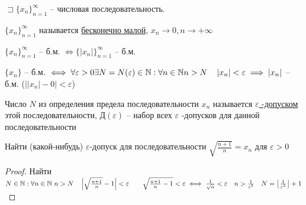     \begin{definition}
        $\sqsupset \{x_n\}_{n=1}^{\infty }$ -- числовая последовательность. 

        $\{x_n\}_{n=1}^{\infty }$ называется \underline{бесконечно малой}, $x_{n} \to 0, n\to +\infty $
    \end{definition}
    
    \begin{note}
        $\{x_n\}_{n=1}^{\infty }$ -- б.м. $\iff \{\left| x_{n}  \right| \}_{n=1}^{\infty }$ -- б.м.

        $\{x_n\}$ -- б.м. $\iff  \forall \varepsilon>0 \exists N = N(\varepsilon)\in \mathbb{N}: \forall n\in \mathbb{N}  n>N\quad \left| x_n \right| <\varepsilon \implies \left| x_n \right|  $ -- б.м. ($\left| \left| x_{n}  \right| -0 \right| <\varepsilon$)
    \end{note}

    \begin{definition}
        Число $N$ из определения предела последовательности $x_{n} $ называется \underline{$\varepsilon$ -допуском} этой последовательности, Д$\left( \varepsilon \right) $ -- набор всех $\varepsilon$ -допусков для данной последовательности
    \end{definition}

    \begin{example}
        Найти (какой-нибудь) $\varepsilon$-допуск для последовательности $\sqrt{\frac{n+1}{n}} = x_{n}  $ для $\varepsilon>0$
    \end{example}
    \begin{proof}
        Найти $N\in \mathbb{N} :\forall n\in \mathbb{N} ~n>N\quad \left| \sqrt{\frac{n+1}{n}} -1 \right| <\varepsilon\qquad \sqrt{\frac{n+1}{n}-1} <\varepsilon \iff  \frac{1}{\sqrt{n} }<\varepsilon\quad n>\frac{1}{\varepsilon^2}\quad N = \left\lfloor \frac{1}{\varepsilon^2} \right\rfloor +1$
    \end{proof}

